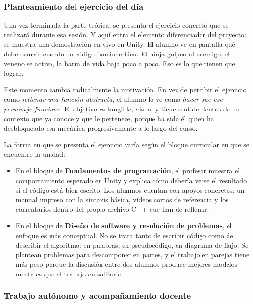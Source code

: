 \documentclass[a4paper,12pt]{article}
\begin{document}
\subsubsection*{Planteamiento del ejercicio del día}

Una vez terminada la parte teórica, se presenta el ejercicio concreto que se
realizará durante esa sesión. Y aquí entra el elemento diferenciador del proyecto:
se muestra una demostración en vivo en Unity. El alumno ve en pantalla qué debe
ocurrir cuando su código funcione bien. El ninja golpea al enemigo, el veneno
se activa, la barra de vida baja poco a poco. Eso es lo que tienen que lograr.

Este momento cambia radicalmente la motivación. En vez de percibir el ejercicio
como \textit{rellenar una función abstracta}, el alumno lo ve como
\textit{hacer que ese personaje funcione}. El objetivo es tangible, visual y
tiene sentido dentro de un contexto que ya conoce y que le pertenece, porque
ha sido él quien ha desbloqueado esa mecánica progresivamente a lo largo del curso.

La forma en que se presenta el ejercicio varía según el bloque curricular en que
se encuentre la unidad:

\begin{itemize}
    \item En el bloque de \textbf{Fundamentos de programación}, el profesor muestra
    el comportamiento esperado en Unity y explica cómo debería verse el resultado
    si el código está bien escrito. Los alumnos cuentan con apoyos concretos:
    un manual impreso con la sintaxis básica, vídeos cortos de referencia y los
    comentarios dentro del propio archivo C++ que han de rellenar.

    \item En el bloque de \textbf{Diseño de software y resolución de problemas},
    el enfoque es más conceptual. No se trata tanto de escribir código como de
    describir el algoritmo: en palabras, en pseudocódigo, en diagrama de flujo.
    Se plantean problemas para descomponer en partes, y el trabajo en parejas
    tiene más peso porque la discusión entre dos alumnos produce mejores modelos
    mentales que el trabajo en solitario.
\end{itemize}

\subsubsection*{Trabajo autónomo y acompañamiento docente}
\end{document}
